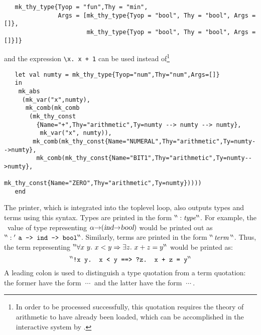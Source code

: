 \begin{hol}
\begin{verbatim}
   mk_thy_type{Tyop = "fun",Thy = "min",
               Args = [mk_thy_type{Tyop = "bool", Thy = "bool", Args = []},
                       mk_thy_type{Tyop = "bool", Thy = "bool", Args = []}]}
\end{verbatim}
\end{hol}

\noindent and the expression {\small\verb|\x. x + 1|}
%
%
can be used instead of\footnote{In order to be processed successfully,
  this quotation requires the theory of arithmetic to have already
  been loaded, which can be accomplished in the interactive system by
  .}

\begin{hol}
\begin{verbatim}
   let val numty = mk_thy_type{Tyop="num",Thy="num",Args=[]}
   in
    mk_abs
     (mk_var("x",numty),
      mk_comb(mk_comb
       (mk_thy_const
         {Name="+",Thy="arithmetic",Ty=numty --> numty --> numty},
          mk_var("x", numty)),
        mk_comb(mk_thy_const{Name="NUMERAL",Thy="arithmetic",Ty=numty-->numty},
         mk_comb(mk_thy_const{Name="BIT1",Thy="arithmetic",Ty=numty-->numty},
                 mk_thy_const{Name="ZERO",Thy="arithmetic",Ty=numty}))))
   end
\end{verbatim}
\end{hol}

The \HOL{} printer, which is integrated into the \ML{} toplevel loop,
also outputs types and terms using this syntax.
%
%
Types are printed
%
%
in the form ${}^{\backprime\backprime} :\mathit{type} {}^{\backprime\backprime}$. For example, the \ML\ value
of type  representing
$\alpha{\to}(\textsl{ind}{\to}\textsl{bool})$ would be printed out
as $\holquote{: \ml{\ensuremath{{}^\prime\!} a -> ind -> bool}}$.
Similarly, terms are printed in the form ${}^{\backprime\backprime} \,\mathit{term}\, {}^{\backprime\backprime}$.
Thus, the term representing $\holquote{\uquant{x\ y}x<y \imp\equant{z}x+z = y}$
would be printed as:
%
\[ \holquote{\ml{!x y. x < y ==> ?z. x + z = y}} \]
%
A leading colon is used to distinguish a type quotation from a term quotation:
the former have the form $\ \cdots\ $ and the latter have
the form $\ \cdots\ $.



